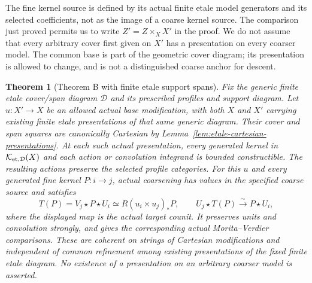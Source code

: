 \documentclass[11pt]{article}
\newtheorem{theorem}{Theorem}[section]
\theoremstyle{definition}
\theoremstyle{remark}
\begin{document}
The fine kernel source is defined by its actual finite etale model
generators and its selected coefficients, not as the image of a
coarse kernel source. The comparison just proved permits us to
write $Z'=Z\times_X X'$ in the proof. We do not assume that every
arbitrary cover first given on $X'$ has a presentation on every
coarser model. The common base is part of the geometric cover
diagram; its presentation is allowed to change, and is not a
distinguished coarse anchor for descent.

\begin{theorem}[Theorem B with finite etale support spans]
\label{thm:etale-span-descent}
Fix the generic finite etale cover/span diagram $\mathcal D$ and
its prescribed profiles and support diagram. Let $u:X'\to X$ be
an allowed actual base modification, with both $X$ and $X'$ carrying
existing finite etale presentations of that same generic diagram.
Their cover and span squares are canonically Cartesian by
Lemma~\ref{lem:etale-cartesian-presentations}.
At each such actual presentation, every generated kernel in
$\mathcal K_{{\rm et},\mathcal D}(X)$ and each action or convolution
integrand is bounded constructible. The resulting actions preserve
the selected profile categories.
For this $u$ and every generated fine kernel $P:i\to j$, actual
coarsening has values in the specified coarse source and satisfies
\[
 T(P)=V_j\star P\star U_i\simeq R(u_i\times u_j)_*P,
 \qquad U_j\star T(P)\xrightarrow{\sim}P\star U_i,
\]
where the displayed map is the actual target counit. It preserves
units and convolution strongly, and gives the corresponding actual
Morita--Verdier comparisons. These are coherent on strings of
Cartesian modifications and independent of common refinement among
existing presentations of the fixed finite etale diagram.
No existence of a presentation on an arbitrary coarser model is asserted.
\end{theorem}
\end{document}

